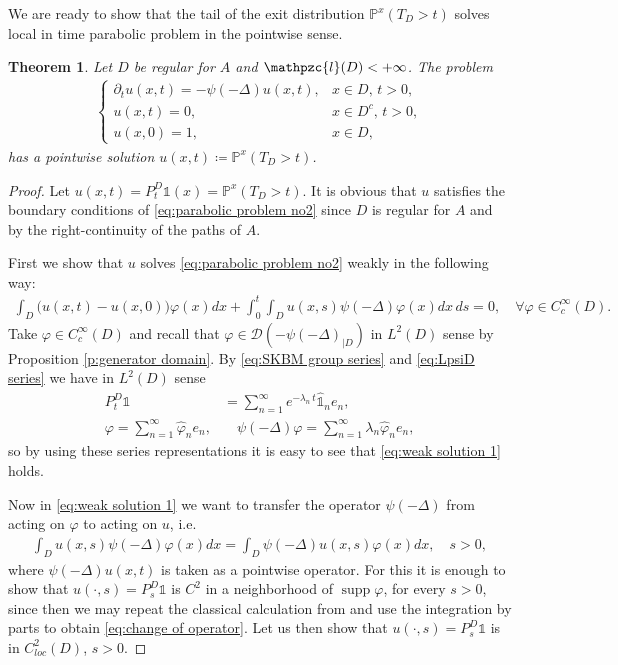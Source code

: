 \documentclass[reqno]{amsart}
\DeclareMathOperator\supp{supp}
\newtheorem{theorem}{Theorem}[section] %
\theoremstyle{remark}
\numberwithin{equation}{section} %
\newcommand{\Lpsi}{\psi(-\Delta)}
\newcommand{\LpsiD}{\Lpsi_{|D}}
\newcommand{\PP}{\mathds{P}}
\newcommand{\DD}{\mathcal{D}}
\newcommand{\wh}{\widehat}
\newcommand{\1}{\mathds{1}}
\begin{document}
	We are ready to show that the tail of the exit distribution $\PP^x(T_D>t)$ solves local in time parabolic problem in the pointwise sense.
	\begin{theorem}\label{t:solution parabolic}
		Let $D$ be regular for $A$ and $\mathpzc{l}(D)<+\infty$. The  problem
		\begin{align}
			\begin{cases}
				\partial_t u(x,t)=-\Lpsi u(x,t), & x\in D,\,t>0,\\
				u(x,t)=0,& x\in D^c,\, t>0,\\
				u(x,0)=1,& x\in D,
			\end{cases}\label{eq:parabolic problem no2}
		\end{align}
		has a pointwise solution $u(x,t)\coloneqq \mathds{P}^x(T_D>t)$.
	\end{theorem}
	\begin{proof}
		Let  $u(x,t)= P^D_t\mathds{1}(x)=\mathds{P}^x(T_D>t)$. It is obvious that $u$ satisfies the boundary conditions of \eqref{eq:parabolic problem no2} since $D$ is regular for $A$ and by the right-continuity of the paths of $A$. 
		
		First we show that $u$ solves \eqref{eq:parabolic problem no2} weakly in the following way:
		\begin{align}\label{eq:weak solution 1}
			\int_D\big(u(x,t)-u(x,0))\varphi(x)dx+\int_0^t\int_D u(x,s)\Lpsi \varphi(x)dx\,ds=0, \quad \forall \varphi\in C_c^\infty(D).
		\end{align}
		Take $\varphi\in C_c^\infty(D)$ and recall that $\varphi \in \DD(-\LpsiD)$ in $L^2(D)$ sense by Proposition \ref{p:generator domain}. By \eqref{eq:SKBM group series} and \eqref{eq:LpsiD series} we have in $L^2(D)$ sense
		\begin{align*}
			P^D_t\mathds{1}&=\sum_{n=1}^\infty e^{-\lambda_n\,t}\wh{\mathds{1}}_n e_n,\\
			\varphi=\sum_{n=1}^\infty\wh\varphi_n e_n,&\quad \Lpsi\varphi=\sum_{n=1}^\infty\lambda_n\wh\varphi_n e_n,
		\end{align*}
		so by using these series representations it is easy to see that \eqref{eq:weak solution 1} holds.
		
		
		Now in \eqref{eq:weak solution 1} we want to transfer the operator $\Lpsi$ from acting on $\varphi$ to acting on $u$, i.e.
		\begin{align}\label{eq:change of operator}
			\int_D u(x,s)\Lpsi \varphi(x)dx=\int_D \Lpsi u(x,s) \varphi(x)dx, \quad s>0,
		\end{align}
		where $\Lpsi u(x,t)$ is taken as a pointwise operator. For this it is enough to show that $u(\cdot,s)= P^D_s\mathds{1}$ is $C^2$ in a neighborhood of $\supp \varphi$, for every $s>0$, since then we may repeat the classical calculation from \cite[Section 3]{bogdan1999potential} and use the integration by parts to obtain \eqref{eq:change of operator}. Let us then show that $u(\cdot,s)= P^D_s\mathds{1}$ is in $C_{loc}^2(D)$, $s>0$.
		

\end{proof}
\end{document}
